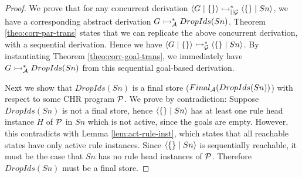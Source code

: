 \documentclass{tlp}
\begin{document}
\begin{proof}
  We prove that for any concurrent derivation $\langle G\mid\{\} \rangle \rightarrowtail^*_{\mid\mid\cal G} \langle \{\}\mid Sn \rangle$,
  we have a corresponding abstract derivation $G \rightarrowtail^*_{\cal A} DropIds(Sn)$. Theorem \ref{theo:corr-par-trans}
  states that we can replicate the above concurrent derivation, with a sequential derivation. Hence we have
  $\langle G\mid\{\} \rangle \rightarrowtail^*_{\cal G} \langle \{\}\mid Sn \rangle$. By instantiating Theorem \ref{theo:corr-goal-trans},
  we immediately have $G \rightarrowtail^*_{\cal A} DropIds(Sn)$ from this sequential goal-based derivation.
  
  Next we show that $DropIds(Sn)$ is a final store ($Final_{\cal A}(DropIds(Sn))$) with respect to some
  CHR program ${\cal P}$. We prove by contradiction: Suppose $DropIds(Sn)$ is not a final store, hence 
  $\langle \{\}\mid Sn \rangle$ has at least one rule head instance $H$ of ${\cal P}$ in $Sn$ which is not active,
  since the goals are empty. However, this contradicts with Lemma \ref{lem:act-rule-inst}, which states that
  all reachable states have only active rule instances. Since $\langle \{\}\mid Sn \rangle$ is sequentially
  reachable, it must be the case that $Sn$ has no rule head instances of ${\cal P}$. Therefore $DropIds(Sn)$
  must be a final store.
\end{proof}
\end{document}
